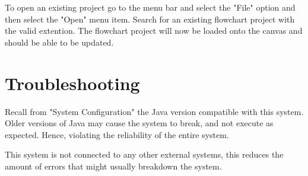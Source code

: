 \documentclass[11pt,a4paper,titlepage]{article}
\begin{document}
	To open an existing project go to the menu bar and select the "File" option and then select the "Open" menu item. Search for an existing flowchart project with the valid extention. The flowchart project will now be loaded onto the canvas and should be able to be updated.
	
\section{Troubleshooting}

Recall from "System Configuration" the Java version compatible with this system. Older versions of Java may cause the system to break, and not execute as expected. Hence, violating the reliability of the entire system.

This system is not connected to any other external systems, this reduces the amount of errors that might usually breakdown the system.
\end{document}
